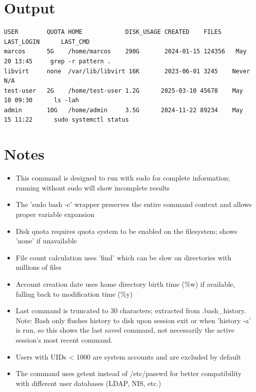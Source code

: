\documentclass[openany]{book}
\begin{document}
\begin{enumerate}
\end{enumerate}

\section*{Output}
\begin{lstlisting}
USER        QUOTA HOME            DISK_USAGE CREATED    FILES LAST_LOGIN      LAST_CMD
marcos      5G    /home/marcos    290G       2024-01-15 124356   May  20 13:45     grep -r pattern .
libvirt     none  /var/lib/libvirt 16K       2023-06-01 3245    Never              N/A
test-user   2G    /home/test-user 1.2G      2025-03-10 45678    May  10 09:30      ls -lah
admin       10G   /home/admin     3.5G      2024-11-22 89234    May  15 11:22      sudo systemctl status
\end{lstlisting}

\section*{Notes}
\begin{itemize}
  \item This command is designed to run with sudo for complete information; running without sudo will show incomplete results
  \item The 'sudo bash -c' wrapper preserves the entire command context and allows proper variable expansion
  \item Disk quota requires quota system to be enabled on the filesystem; shows 'none' if unavailable
  \item File count calculation uses 'find' which can be slow on directories with millions of files
  \item Account creation date uses home directory birth time (\%w) if available, falling back to modification time (\%y)
  \item Last command is truncated to 30 characters; extracted from .bash\_history. Note: Bash only flushes history to disk upon session exit or when 'history -a' is run, so this shows the last saved command, not necessarily the active session's most recent command.
  \item Users with UIDs < 1000 are system accounts and are excluded by default
  \item The command uses getent instead of /etc/passwd for better compatibility with different user databases (LDAP, NIS, etc.)
\end{itemize}
\end{document}

